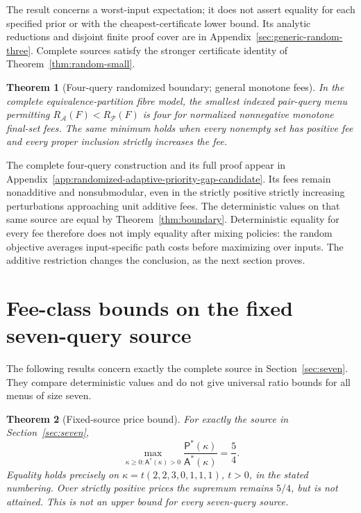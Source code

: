\documentclass[pdflatex,sn-mathphys-num]{sn-jnl}
\newcommand{\A}{\mathsf{A}}
\newcommand{\Pcost}{\mathsf{P}}
\theoremstyle{thmstyleone}
\newtheorem{theorem}{Theorem}
\theoremstyle{thmstylethree}
\theoremstyle{thmstyletwo}
\begin{document}
The result concerns a worst-input expectation; it does not assert
equality for each specified prior or with the cheapest-certificate
lower bound. Its analytic reductions and disjoint finite proof cover
are in Appendix~\ref{sec:generic-random-three}. Complete sources satisfy
the stronger certificate identity of Theorem~\ref{thm:random-small}.

\begin{theorem}[Four-query randomized boundary; general monotone fees]\label{thm:random-priority-four}
In the complete equivalence-partition fibre model, the smallest indexed
pair-query menu permitting $R_{\mathcal A}(F)<R_{\mathcal P}(F)$ is four
for normalized nonnegative monotone final-set fees. The same minimum
holds when every nonempty set has positive fee and every proper
inclusion strictly increases the fee.
\end{theorem}

The complete four-query construction and its full proof appear in
Appendix~\ref{app:randomized-adaptive-priority-gap-candidate}.
Its fees remain nonadditive and nonsubmodular, even in the strictly
positive strictly increasing perturbations approaching unit additive
fees. The deterministic values on that same source are equal by
Theorem~\ref{thm:boundary}. Deterministic equality for every fee
therefore does not imply equality after mixing policies: the random
objective averages input-specific path costs before maximizing over
inputs. The additive restriction changes the conclusion, as the next
section proves.



\section{Fee-class bounds on the fixed seven-query source}
\label{sec:fixed-cost-core}
The following results concern exactly the complete source in
Section~\ref{sec:seven}. They compare deterministic values and do not
give universal ratio bounds for all menus of size seven.

\begin{theorem}[Fixed-source price bound]\label{thm:price}
For exactly the source in Section~\ref{sec:seven},
\[
 \max_{\kappa\geq0:\A^*(\kappa)>0}
 \frac{\Pcost^*(\kappa)}{\A^*(\kappa)}=\frac54.
\]
Equality holds precisely on $\kappa=t(2,2,3,0,1,1,1)$, $t>0$, in the stated numbering. Over strictly positive prices the supremum remains $5/4$, but is not attained. This is not an upper bound for every seven-query source.
\end{theorem}
\end{document}
